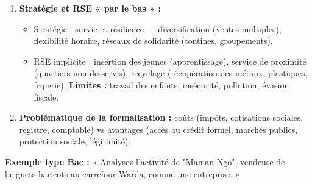 \documentclass[11pt]{article}
\newcommand{\cle}[1]{{\popxbold\color{popdark}#1}}
\begin{document}
\begin{methode}
\begin{enumerate}
\begin{itemize}
                  \item \cle{Recettes journalières} - \cle{dépenses variables} (achats, carburant, redevances, repas) = \cle{marge journalière}.
                  \item \cle{Revenu net disponible} = marge - charges fixes (loyer du domicile, scolarité des enfants, santé, épargne tontine) - amortissement implicite (usure de la moto ou de la machine).
                  \item \textbf{Seuil de rentabilité vital :} le revenu net doit couvrir les besoins essentiels du ménage.
              \end{itemize}
        \item \textbf{Stratégie et RSE « par le bas » :}
              \begin{itemize}
                  \item \cle{Stratégie} : survie et résilience — diversification (ventes multiples), flexibilité horaire, réseaux de solidarité (tontines, groupements).
                  \item \cle{RSE implicite} : insertion des jeunes (apprentissage), service de proximité (quartiers non desservis), recyclage (récupération des métaux, plastiques, friperie). \textbf{Limites :} travail des enfants, insécurité, pollution, évasion fiscale.
              \end{itemize}
        \item \textbf{Problématique de la formalisation :} coûts (impôts, cotisations sociales, registre, comptable) vs avantages (accès au crédit formel, marchés publics, protection sociale, légitimité).
    \end{enumerate}
    \textbf{Exemple type Bac :} « Analysez l'activité de "Maman Ngo", vendeuse de beignets-haricots au carrefour Warda, comme une entreprise. »
\end{methode}
\end{document}

